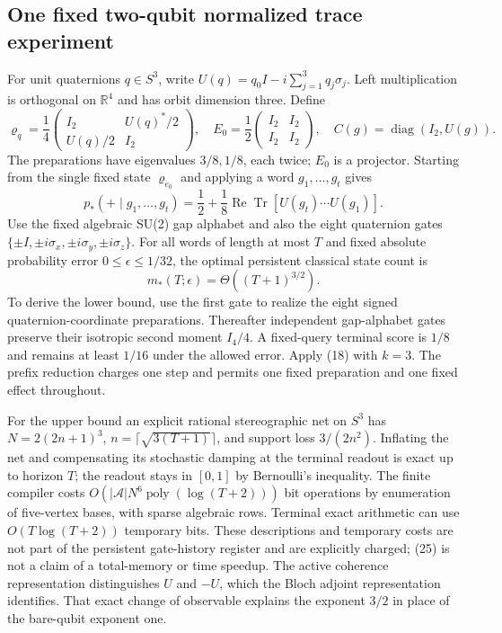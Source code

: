 \documentclass[11pt]{article}
\newcommand{\Tr}{\operatorname{Tr}}
\begin{document}
\subsection{One fixed two-qubit normalized trace experiment}

For unit quaternions $q\in S^3$, write $U(q)=q_0I-i\sum_{j=1}^3q_j\sigma_j$. Left multiplication is orthogonal on $\mathbb R^4$ and has orbit dimension three. Define
\[
\varrho_q=\frac14\begin{pmatrix}I_2&U(q)^*/2\\U(q)/2&I_2\end{pmatrix},\quad
E_0=\frac12\begin{pmatrix}I_2&I_2\\I_2&I_2\end{pmatrix},\quad
C(g)=\operatorname{diag}(I_2,U(g)).
\]
The preparations have eigenvalues $3/8,1/8$, each twice; $E_0$ is a projector. Starting from the single fixed state $\varrho_{e_0}$ and applying a word $g_1,\ldots,g_t$ gives
\[
p_*(+\mid g_1,\ldots,g_t)
=\frac12+\frac18\operatorname{Re}\Tr[U(g_t)\cdots U(g_1)].\tag{24}
\]
Use the fixed algebraic SU(2) gap alphabet and also the eight quaternion gates $\{\pm I,\pm i\sigma_x,\pm i\sigma_y,\pm i\sigma_z\}$. For all words of length at most $T$ and fixed absolute probability error $0\le\epsilon\le1/32$, the optimal persistent classical state count is
\[
m_*(T;\epsilon)=\Theta((T+1)^{3/2}).\tag{25}
\]
To derive the lower bound, use the first gate to realize the eight signed quaternion-coordinate preparations. Thereafter independent gap-alphabet gates preserve their isotropic second moment $I_4/4$. A fixed-query terminal score is $1/8$ and remains at least $1/16$ under the allowed error. Apply (18) with $k=3$. The prefix reduction charges one step and permits one fixed preparation and one fixed effect throughout.

For the upper bound an explicit rational stereographic net on $S^3$ has $N=2(2n+1)^3$, $n=\lceil\sqrt{3(T+1)}\rceil$, and support loss $3/(2n^2)$. Inflating the net and compensating its stochastic damping at the terminal readout is exact up to horizon $T$; the readout stays in $[0,1]$ by Bernoulli's inequality. The finite compiler costs $O(|\mathcal A|N^6\operatorname{poly}(\log(T+2)))$ bit operations by enumeration of five-vertex bases, with sparse algebraic rows. Terminal exact arithmetic can use $O(T\log(T+2))$ temporary bits. These descriptions and temporary costs are not part of the persistent gate-history register and are explicitly charged; (25) is not a claim of a total-memory or time speedup. The active coherence representation distinguishes $U$ and $-U$, which the Bloch adjoint representation identifies. That exact change of observable explains the exponent $3/2$ in place of the bare-qubit exponent one.
\end{document}
